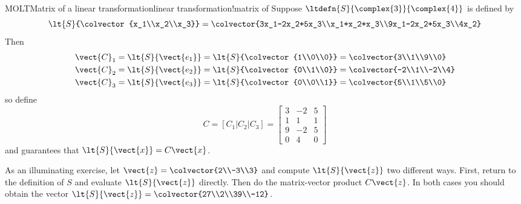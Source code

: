\begin{example}{MOLT}{Matrix of a linear transformation}{linear transformation!matrix of}
%
Suppose $\ltdefn{S}{\complex{3}}{\complex{4}}$ is defined by
%
\begin{equation*}
\lt{S}{\colvector{x_1\\x_2\\x_3}}=\colvector{3x_1-2x_2+5x_3\\x_1+x_2+x_3\\9x_1-2x_2+5x_3\\4x_2}
\end{equation*}
%
Then
%
\begin{align*}
\vect{C}_1&=\lt{S}{\vect{e_1}}=\lt{S}{\colvector{1\\0\\0}}=\colvector{3\\1\\9\\0}\\
\vect{C}_2&=\lt{S}{\vect{e_2}}=\lt{S}{\colvector{0\\1\\0}}=\colvector{-2\\1\\-2\\4}\\
\vect{C}_3&=\lt{S}{\vect{e_3}}=\lt{S}{\colvector{0\\0\\1}}=\colvector{5\\1\\5\\0}
\end{align*}
%
so define
%
\begin{equation*}
C=\left[C_1|C_2|C_3\right]=
\begin{bmatrix}
3&-2&5\\
1&1&1\\
9&-2&5\\
0&4&0
\end{bmatrix}
\end{equation*}
%
and  guarantees that $\lt{S}{\vect{x}}=C\vect{x}$.\par
%
As an illuminating exercise, let $\vect{z}=\colvector{2\\-3\\3}$ and compute $\lt{S}{\vect{z}}$ two different ways.  First, return to the definition of $S$ and evaluate $\lt{S}{\vect{z}}$ directly.  Then do the matrix-vector product $C\vect{z}$.  In both cases you should obtain the vector $\lt{S}{\vect{z}}=\colvector{27\\2\\39\\-12}$.
%
\end{example}
